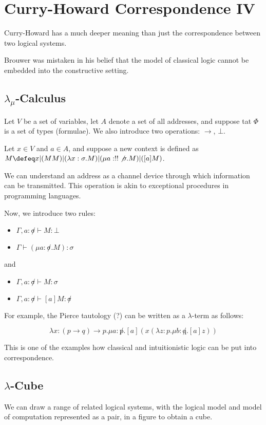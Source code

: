 \documentclass[11pt]{scrartcl}
\begin{document}
\section{Curry-Howard Correspondence IV}

Curry-Howard has a much deeper meaning than just the correspondence
between two logical systems.

Brouwer was mistaken in his belief that the model of classical logic
cannot be embedded into the constructive setting.

\subsection{$\lambda_{\mu}$-Calculus}

Let $V$ be a set of variables, let $A$ denote a set of all addresses,
and suppose tat $\Phi$ is a set of types (formulae). We also introduce
two operations: $\to$, $\bot$.

Let $x\in V$ and $a\in A$, and suppose a new context is defined as
$M \defeq x | (MM) | (\lambda x:\sigma.M) | (\mu a: !!\not \sigma. M) |
([a]M)$.

We can understand an address as a channel device through which
information can be transmitted. This operation is akin to exceptional
procedures in programming languages.

Now, we introduce two rules:

\begin{itemize}
\item $\Gamma, a: \not \sigma \vdash M: \bot$
\item $\Gamma \vdash (\mu a : \not \sigma. M):\sigma$
\end{itemize}

and

\begin{itemize}
\item $\Gamma, a : \not \sigma \vdash M:\sigma$
\item $\Gamma, a : \not \sigma \vdash [a]M: \not \sigma$
\end{itemize}

For example, the Pierce tautology (?) can be written as a $\lambda$-term as follows:

\begin{equation*}
\lambda x: (p\to q)\to p.\mu a : \not p.[a](x (\lambda z:p.\mu b: \not q. [a]z))
\end{equation*}

This is one of the examples how classical and intuitionistic logic can
be put into correspondence.

\subsection{$\lambda$-Cube}

We can draw a range of related logical systems, with the logical model
and model of computation represented as a pair, in a figure to obtain a cube.
\end{document}
